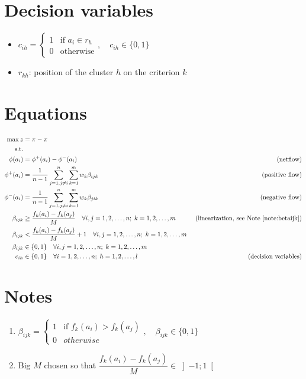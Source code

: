 \documentclass[a4paper]{article}
\begin{document}
    \section{Decision variables}
    \begin{itemize}
        \item $c_{ih} = \begin{cases}
            1 & \text{if } a_i \in r_h \\
            0 & \text{otherwise}
        \end{cases}, \quad c_{ih} \in \{0, 1\}$
        \item $r_{kh}$: position of the cluster $h$ on the criterion $k$
    \end{itemize}
    \section{Equations}
    \begin{align}
        \max z &= \pi_{} - \pi_{}\\
        \text{s.t.} & \\
        \phi(a_i) &= \phi^+(a_i) - \phi^-(a_i) & \text{ (netflow)} \\
        \phi^+(a_i) &= \frac{1}{n-1} \sum_{j=1, j\neq i}^{n} \sum_{k=1}^{m} w_k \beta_{ijk} & \text{ (positive flow)} \\
        \phi^-(a_i) &= \frac{1}{n-1} \sum_{j=1, j\neq i}^{n} \sum_{k=1}^{m} w_k \beta_{jik} & \text{ (negative flow)} \\
        \beta_{ijk} &\geq \frac{f_k(a_i)-f_k(a_j)}{M} \quad \forall i,j = 1, 2, \dots, n;\; k = 1, 2, \dots, m & \text{ (linearization, see Note \ref{note:betaijk})} \\
        \beta_{ijk} &< \frac{f_k(a_i)-f_k(a_j)}{M} + 1 \quad \forall i,j = 1, 2, \dots, n;\; k = 1, 2, \dots, m \\
        \beta_{ijk} &\in \{0,1\} \quad \forall i,j = 1, 2, \dots, n;\; k = 1, 2, \dots, m \\
        c_{ih} &\in \{0, 1\} \quad \forall i = 1, 2, \dots, n;\; h = 1, 2, \dots, l & \text{ (decision variables)}
    \end{align}
    \section{Notes}
    \begin{enumerate}
        \item \label{note:betaijk} $\beta_{ijk} = \begin{cases}
            1 & \text{if } f_k(a_i) > f_k(a_j) \\
            0 & otherwise
        \end{cases}, \quad \beta_{ijk} \in \{0, 1\}$
        \item \label{note:bigm} Big $M$ chosen so that $\dfrac{f_k(a_i)-f_k(a_j)}{M} \in \left]-1;1\right[$
    \end{enumerate}
\end{document}
